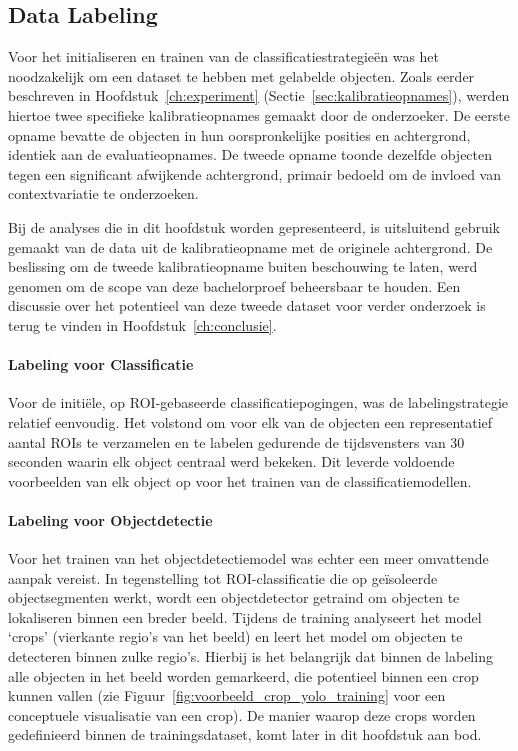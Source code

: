 \subsection{Data Labeling}

Voor het initialiseren en trainen van de classificatiestrategieën was het noodzakelijk om een dataset te hebben met gelabelde objecten.
Zoals eerder beschreven in Hoofdstuk~\ref{ch:experiment} (Sectie~\ref{sec:kalibratieopnames}), werden hiertoe 
twee specifieke kalibratieopnames gemaakt door de onderzoeker.
De eerste opname bevatte de objecten in hun oorspronkelijke posities en achtergrond, identiek aan de evaluatieopnames.
De tweede opname toonde dezelfde objecten tegen een significant afwijkende achtergrond, 
primair bedoeld om de invloed van contextvariatie te onderzoeken.

Bij de analyses die in dit hoofdstuk worden gepresenteerd, is uitsluitend gebruik gemaakt 
van de data uit de kalibratieopname met de originele achtergrond.
De beslissing om de tweede kalibratieopname buiten beschouwing te laten, werd genomen om de scope van deze bachelorproef beheersbaar te houden.
Een discussie over het potentieel van deze tweede dataset voor verder onderzoek is terug te vinden in Hoofdstuk~\ref{ch:conclusie}.

\paragraph{Labeling voor Classificatie}
Voor de initiële, op ROI-gebaseerde classificatiepogingen, was de labelingstrategie relatief eenvoudig.
Het volstond om voor elk van de objecten een representatief aantal ROIs te verzamelen en te labelen gedurende de 
tijdsvensters van 30 seconden waarin elk object centraal werd bekeken. 
Dit leverde voldoende voorbeelden van elk object op voor het trainen van de classificatiemodellen.

\paragraph{Labeling voor Objectdetectie}
Voor het trainen van het objectdetectiemodel was echter een meer omvattende aanpak vereist.
In tegenstelling tot ROI-classificatie die op geïsoleerde objectsegmenten werkt, wordt een objectdetector 
getraind om objecten te lokaliseren binnen een breder beeld.
Tijdens de training analyseert het model `crops' (vierkante regio's van het beeld) en leert het model om objecten te detecteren binnen zulke regio's.
Hierbij is het belangrijk dat binnen de labeling alle objecten in het beeld worden gemarkeerd, die potentieel binnen een crop kunnen vallen
(zie Figuur~\ref{fig:voorbeeld_crop_yolo_training} voor een conceptuele visualisatie van een crop).
De manier waarop deze crops worden gedefinieerd binnen de trainingsdataset, komt later in dit hoofdstuk aan bod.

